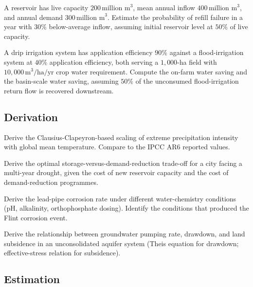 \begin{exercise}
A reservoir has live capacity $200\,\text{million m}^3$, mean annual inflow $400\,\text{million m}^3$, and annual demand $300\,\text{million m}^3$. Estimate the probability of refill failure in a year with $30\%$ below-average inflow, assuming initial reservoir level at $50\%$ of live capacity.
\end{exercise}

\begin{exercise}
A drip irrigation system has application efficiency $90\%$ against a flood-irrigation system at $40\%$ application efficiency, both serving a $1{,}000$-ha field with $10{,}000\,\text{m}^3/\text{ha/yr}$ crop water requirement. Compute the on-farm water saving and the basin-scale water saving, assuming $50\%$ of the unconsumed flood-irrigation return flow is recovered downstream.
\end{exercise}

\subsection*{Derivation}

\begin{exercise}
Derive the Clausius-Clapeyron-based scaling of extreme precipitation intensity with global mean temperature. Compare to the IPCC AR6 reported values.
\end{exercise}

\begin{exercise}
Derive the optimal storage-versus-demand-reduction trade-off for a city facing a multi-year drought, given the cost of new reservoir capacity and the cost of demand-reduction programmes.
\end{exercise}

\begin{exercise}
Derive the lead-pipe corrosion rate under different water-chemistry conditions (pH, alkalinity, orthophosphate dosing). Identify the conditions that produced the Flint corrosion event.
\end{exercise}

\begin{exercise}
Derive the relationship between groundwater pumping rate, drawdown, and land subsidence in an unconsolidated aquifer system (Theis equation for drawdown; effective-stress relation for subsidence).
\end{exercise}

\subsection*{Estimation}

